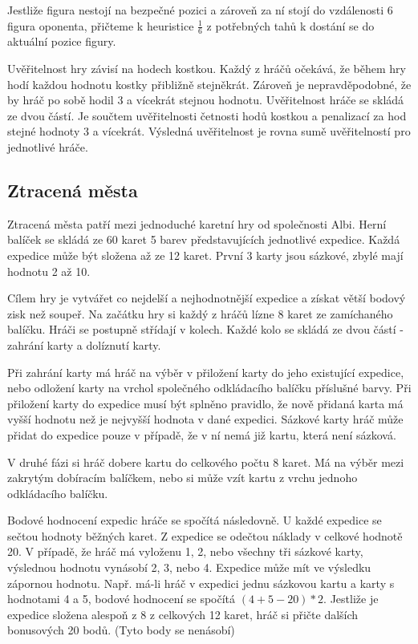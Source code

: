 Jestliže figura nestojí na bezpečné pozici a zároveň za ní stojí do vzdálenosti 6 figura oponenta, přičteme k heuristice $\frac{1}{6}$ z potřebných tahů k dostání se do aktuální pozice figury.

Uvěřitelnost hry závisí na hodech kostkou. Každý z hráčů očekává, že během hry hodí každou hodnotu kostky přibližně stejněkrát. Zároveň je nepravděpodobné, že by hráč po sobě hodil 3 a vícekrát stejnou hodnotu. Uvěřitelnost hráče se skládá ze dvou částí. Je součtem uvěřitelnosti četnosti hodů kostkou a penalizací za hod stejné hodnoty 3 a vícekrát. Výsledná uvěřitelnost je rovna sumě uvěřitelností pro jednotlivé hráče.

\subsection{Ztracená města}

Ztracená města patří mezi jednoduché karetní hry od společnosti Albi. Herní balíček se skládá ze 60 karet 5 barev představujících jednotlivé expedice. Každá expedice může být složena až ze 12 karet. První 3 karty jsou sázkové, zbylé mají hodnotu 2 až 10. 

Cílem hry je vytvářet co nejdelší a nejhodnotnější expedice a získat větší bodový zisk než soupeř. Na začátku hry si každý z hráčů lízne 8 karet ze zamíchaného balíčku. Hráči se postupně střídají v kolech. Každé kolo se skládá ze dvou částí - zahrání karty a dolíznutí karty. 

Při zahrání karty má hráč na výběr v přiložení karty do jeho existující expedice, nebo odložení karty na vrchol společného odkládacího balíčku příslušné barvy. Při přiložení karty do expedice musí být splněno pravidlo, že nově přidaná karta má vyšší hodnotu než je nejvyšší hodnota v dané expedici. Sázkové karty hráč může přidat do expedice pouze v případě, že v ní nemá již kartu, která není sázková. 

V druhé fázi si hráč dobere kartu do celkového počtu 8 karet. Má na výběr mezi zakrytým dobíracím balíčkem, nebo si může vzít kartu z vrchu jednoho odkládacího balíčku.

Bodové hodnocení expedic hráče se spočítá následovně. U každé expedice se sečtou hodnoty běžných karet. Z expedice se odečtou náklady v celkové hodnotě 20. V případě, že hráč má vyloženu 1, 2, nebo všechny tři sázkové karty, výslednou hodnotu vynásobí 2, 3, nebo 4. Expedice může mít ve výsledku zápornou hodnotu. Např. má-li hráč v expedici jednu sázkovou kartu a karty s hodnotami 4 a 5, bodové hodnocení se spočítá $(4 + 5 - 20) * 2$. Jestliže je expedice složena alespoň z 8 z celkových 12 karet, hráč si přičte dalších bonusových 20 bodů. (Tyto body se nenásobí)

